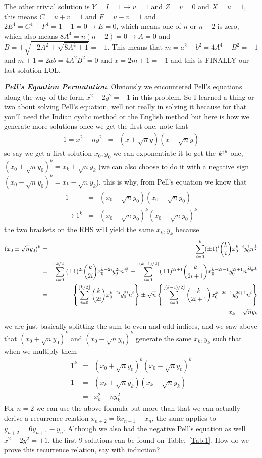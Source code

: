 \documentclass[aps,preprint,preprintnumbers,nofootinbib,showpacs,prd]{revtex4-1}
\newcommand{\nbea}{\begin{eqnarray*}}
\newcommand{\neea}{\end{eqnarray*}}
\DeclarePairedDelimiter{\floor}{\lfloor}{\rfloor}
\begin{document}
The other trivial solution is $Y = I = 1 \to v = 1$ and $Z = v = 0$ and $X = u = 1$, this means $C = u + v = 1$ and $F = u - v = 1$ and $2E^4 = C^4 - F^4 = 1 - 1 = 0 \to E = 0$, which means one of $n$ or $n + 2$ is zero, which also means $8A^4 = n(n + 2) = 0 \to A = 0$ and $B = \pm \sqrt{-2A^2 \pm\sqrt{8A^4 + 1}} = \pm 1$. This means that $m = a^2 - b^2 = 4A^4 - B^2 = -1$ and $m + 1 = 2ab = 4A^2B^2 = 0$ and $x = 2m+1 = -1$ and this is FINALLY our last solution LOL.


\bigskip
\underline{\textbf{\textit{Pell's Equation Permutation}}}. Obviously we encountered Pell's equations along the way of the form $x^2 - 2y^2 = \pm 1$ in this problem. So I learned a thing or two about solving Pell's equation, well not really in solving it because for that you'll need the Indian cyclic method or the English method but here is how we generate more solutions once we get the first one, note that
%
\nbea
1 = x^2 - n y^2 & = & (x + \sqrt{n}y)(x - \sqrt{n}y)
\neea
%
so say we get a first solution $x_0, y_0$ we can exponentiate it to get the $k^{\rm th}$ one, $(x_0 + \sqrt{n}y_0)^k = x_k + \sqrt{n}y_k$ (we can also choose to do it with a negative sign $(x_0 - \sqrt{n}y_0)^k = x_k - \sqrt{n}y_k$), this is why, from Pell's equation we know that
%
\nbea
1 & = & (x_0 + \sqrt{n}y_0)(x_0 - \sqrt{n}y_0) \\
\to 1^k & = & (x_0 + \sqrt{n}y_0)^k(x_0 - \sqrt{n}y_0)^k
\neea
%
the two brackets on the RHS will yield the same $x_k, y_k$ because
%
\nbea
(x_0 \pm \sqrt{n}y_0)^k & = & \sum_{i=0}^k (\pm 1)^i \binom{k}{i} x_0^{k-i} y_0^i n^{\frac{i}{2}} \\
& = & \sum_{i=0}^{\floor{k/2}} (\pm 1)^{2i} \binom{k}{2i} x_0^{k-2i} y_0^{2i} n^{\frac{2i}{2}} + \sum_{i=0}^{\floor{(k-1)/2}} (\pm 1)^{2i+1} \binom{k}{2i+1} x_0^{k-2i-1} y_0^{2i+1} n^{\frac{2i+1}{2}} \\
& = & \left\{\sum_{i=0}^{\floor{k/2}} \binom{k}{2i} x_0^{k-2i} y_0^{2i} n^{i}\right\} \pm \sqrt{n} \left\{\sum_{i=0}^{\floor{(k-1)/2}} \binom{k}{2i+1} x_0^{k-2i-1} y_0^{2i+1} n^{i}\right\} \\
& = & x_k \pm \sqrt{n} y_k 
\neea
%
we are just basically splitting the sum to even and odd indices, and we saw above that $(x_0 + \sqrt{n}y_0)^k$ and $(x_0 - \sqrt{n}y_0)^k$ generate the same $x_k, y_k$ such that when we multiply them
%
\nbea
1^k & = & (x_0 + \sqrt{n}y_0)^k(x_0 - \sqrt{n}y_0)^k \\
1 & = & (x_k + \sqrt{n}y_k)(x_k - \sqrt{n}y_k) \\
& = & x_k^2 - n y_k^2
\neea
%
For $n = 2$ we can use the above formula but more than that we can actually derive a recurrence relation $x_{n+2} = 6x_{n+1} - x_n$, the same applies to $y_{n+2} = 6y_{n+1} - y_n$. Although we also had the negative Pell's equation as well $x^2 - 2y^2 = \pm1$, the first 9 solutions can be found on Table.~\ref{Tab:1}. How do we prove this recurrence relation, say with induction?
\end{document}
